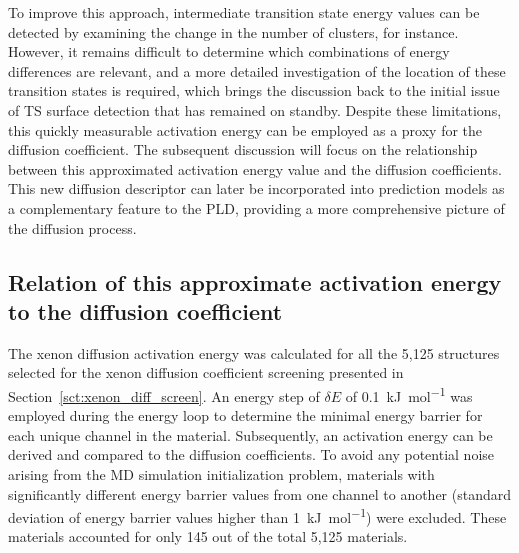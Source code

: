\documentclass[main]{subfiles}
\begin{document}
To improve this approach, intermediate transition state energy values can be detected by examining the change in the number of clusters, for instance. However, it remains difficult to determine which combinations of energy differences are relevant, and a more detailed investigation of the location of these transition states is required, which brings the discussion back to the initial issue of TS surface detection that has remained on standby. Despite these limitations, this quickly measurable activation energy can be employed as a proxy for the diffusion coefficient.
The subsequent discussion will focus on the relationship between this approximated activation energy value and the diffusion coefficients. This new diffusion descriptor can later be incorporated into prediction models as a complementary feature to the PLD, providing a more comprehensive picture of the diffusion process.

\subsection{Relation of this approximate activation energy to the diffusion coefficient}

The xenon diffusion activation energy was calculated for all the 5,125 structures selected for the xenon diffusion coefficient screening presented in Section~\ref{sct:xenon_diff_screen}. An energy step of $\delta E$ of \SI{0.1}{\kJ\per\mol} was employed during the energy loop to determine the minimal energy barrier for each unique channel in the material. Subsequently, an activation energy can be derived and compared to the diffusion coefficients. To avoid any potential noise arising from the MD simulation initialization problem, materials with significantly different energy barrier values from one channel to another (standard deviation of energy barrier values higher than \SI{1}{\kJ\per\mol}) were excluded. These materials accounted for only 145 out of the total 5,125 materials.
\end{document}
